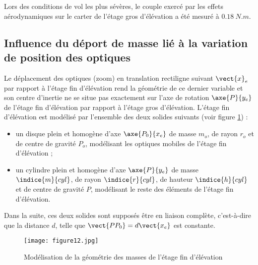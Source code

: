 Lors des conditions de vol les plus sévères, le couple exercé par les effets aérodynamiques sur le carter de l'étage
gros d'élévation a été mesuré à $\SI{0,18}{N.m}$.

\ifprof
\begin{corrige}
\end{corrige}
\else
\fi

\subsection{Influence du déport de masse lié à la variation de position des optiques}

Le déplacement des optiques (zoom) en translation rectiligne suivant $\vect{x}_e$ par rapport à l'étage fin d'élévation
rend la géométrie de ce dernier variable et son centre d'inertie ne se situe pas exactement sur l'axe de rotation
$\axe{P}{{y_e}}$ de l'étage fin d'élévation par rapport à l'étage gros d'élévation.
L'étage fin d'élévation est modélisé par l'ensemble des deux solides suivants (voir figure \ref{figure12}) :
\begin{itemize}
\item un disque plein et homogène d'axe $\axe{P_0}{{x_e}}$ de masse $m_o$, de rayon $r_o$ et de centre de gravité $P_o$, modélisant les optiques mobiles de l'étage fin d'élévation ;
\item un cylindre plein et homogène d'axe $\axe{P}{{y_e}}$ de masse $\indice{m}{cyl}$, de rayon $\indice{r}{cyl}$, de hauteur $\indice{h}{cyl}$ et de centre de gravité $P$, modélisant le reste des éléments de l'étage fin d'élévation.
\end{itemize}

Dans la suite, ces deux solides sont supposés être en liaison complète, c'est-à-dire que la distance $d$, telle que $\vect{PP_0}=d\vect{x_e}$ est constante.

\begin{figure}[!htb]
\begin{center}
\texttt{[image: figure12.jpg]}
\caption{Modélisation de la géométrie des masses de l'étage fin d'élévation \label{figure12}}
\end{center}
\end{figure}

